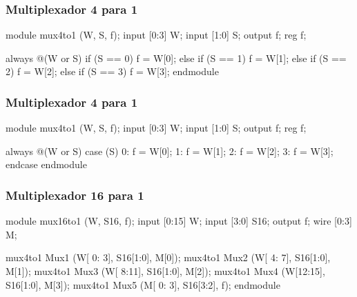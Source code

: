 \begin{frame}[fragile]
	\frametitle{Multiplexador 4 para 1}
	\begin{verilogcode}
module mux4to1 (W, S, f); 
  input [0:3] W;
  input [1:0] S;
  output f;
  reg f;

  always @(W or S) 
    if (S == 0)
      f = W[0]; 
    else if (S == 1) 
      f = W[1]; 
    else if (S == 2)
      f = W[2]; 
    else if (S == 3) 
      f = W[3];
endmodule
    \end{verilogcode} 
\end{frame}



\begin{frame}[fragile]
	\frametitle{Multiplexador 4 para 1}
	\begin{verilogcode}
module mux4to1 (W, S, f); 
  input [0:3] W;
  input [1:0] S;
  output f;
  reg f;

  always @(W or S) 
    case (S)
      0: f = W[0]; 
      1: f = W[1]; 
      2: f = W[2]; 
      3: f = W[3];
    endcase 
endmodule
    \end{verilogcode} 
\end{frame}

\begin{frame}[fragile]
	\frametitle{Multiplexador 16 para 1}
	\begin{verilogcode}
module mux16to1 (W, S16, f); 
  input [0:15] W;
  input [3:0] S16;
  output f;
  wire [0:3] M;

  mux4to1 Mux1 (W[ 0: 3], S16[1:0], M[0]);
  mux4to1 Mux2 (W[ 4: 7], S16[1:0], M[1]);
  mux4to1 Mux3 (W[ 8:11], S16[1:0], M[2]);
  mux4to1 Mux4 (W[12:15], S16[1:0], M[3]);
  mux4to1 Mux5 (M[ 0: 3], S16[3:2], f);
endmodule
    \end{verilogcode} 
\end{frame}

